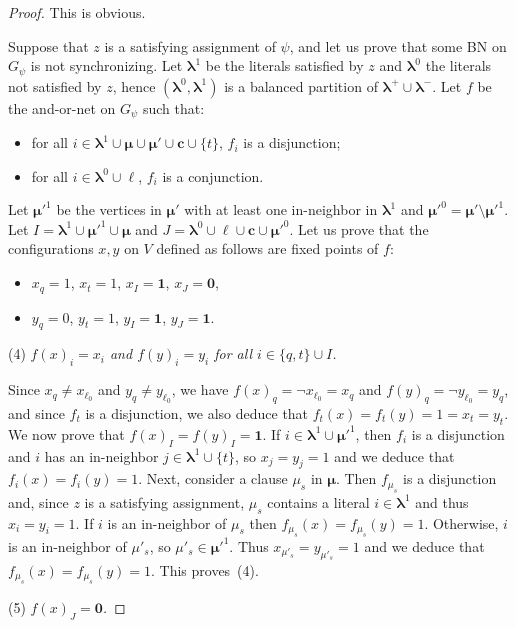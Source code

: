 \documentclass[11pt,letter]{article}
\newcommand{\BF}[1]{{{\boldmath{\bf #1}\unboldmath}}}
\newcommand{\ONE}{\mathbf{1}}
\newcommand{\ZERO}{{\mathbf{0}}}
\newcommand{\LAMBDA}{\boldsymbol{\lambda}}
\newcommand{\MU}{\boldsymbol{\mu}}
\newcommand{\ELL}{\boldsymbol{\ell}}
\newcommand{\C}{\boldsymbol{c}}
\begin{document}
\begin{proof}
\bigskip
\noindent
\BF{($3 \Rightarrow 4$)} This is obvious.

\bigskip
\noindent
\BF{($4 \Rightarrow 1$)} Suppose that $z$ is a satisfying assignment of $\psi$, and let us prove that some BN on $G_\psi$ is not synchronizing. Let $\LAMBDA^1$ be the literals satisfied by $z$ and $\LAMBDA^0$ the literals not satisfied by $z$, hence $(\LAMBDA^0,\LAMBDA^1)$ is a balanced partition of $\LAMBDA^+\cup\LAMBDA^-$. Let $f$ be the and-or-net on $G_\psi$ such that:
\begin{itemize}
\item
for all $i\in \LAMBDA^1\cup\MU\cup\MU'\cup\C\cup\{t\}$, $f_i$ is a disjunction;
\item
for all $i\in\LAMBDA^0\cup\ELL$, $f_i$ is a conjunction. 
\end{itemize}

\medskip
Let $\MU'^1$ be the vertices in $\MU'$ with at least one in-neighbor in $\LAMBDA^1$ and $\MU'^0=\MU'\setminus\MU'^1$. Let $I=\LAMBDA^1\cup\MU'^1\cup \MU$ and $J=\LAMBDA^0\cup\ELL\cup\C\cup\MU'^0$. Let us prove that the configurations $x,y$ on $V$ defined as follows are fixed points of $f$:
\begin{itemize}
\item
$x_q=1$, $x_t=1$, $x_I=\ONE$, $x_J=\ZERO$,
\item
$y_q=0$, $y_t=1$, $y_I=\ONE$, $y_J=\ONE$.
\end{itemize}

\bigskip
\noindent
(4) {\em $f(x)_i=x_i$ and $f(y)_i=y_i$ for all $i\in \{q,t\}\cup I$.}

\medskip
\noindent
Since $x_q\neq x_{\ell_0}$ and $y_q\neq y_{\ell_0}$, we have $f(x)_q=\neg x_{\ell_0}=x_q$ and $f(y)_q=\neg y_{\ell_0}=y_q$, and since $f_t$ is a disjunction, we also deduce that $f_t(x)=f_t(y)=1=x_t=y_t$. We now prove that $f(x)_I=f(y)_I=\ONE$. If $i\in\LAMBDA^1\cup\MU'^1$, then $f_i$ is a disjunction and $i$ has an in-neighbor  $j\in\LAMBDA^1\cup\{t\}$, so $x_j=y_j=1$ and we deduce that $f_i(x)=f_i(y)=1$. Next, consider a clause $\mu_s$ in $\MU$. Then $f_{\mu_s}$ is a disjunction and, since $z$ is a satisfying assignment, $\mu_s$ contains a literal $i\in\LAMBDA^1$ and thus $x_i=y_i=1$. If $i$ is an in-neighbor of $\mu_s$ then $f_{\mu_s}(x)=f_{\mu_s}(y)=1$. Otherwise, $i$ is an in-neighbor of $\mu'_s$, so $\mu'_s\in\MU'^1$. Thus $x_{\mu'_s}=y_{\mu'_s}=1$ and we deduce that $f_{\mu_s}(x)=f_{\mu_s}(y)=1$. This proves~(4).

\bigskip
\noindent
(5) {\em $f(x)_J=\ZERO$.}


\end{proof}
\end{document}
